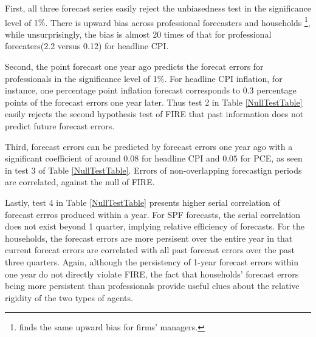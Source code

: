 \documentclass[]{article}
\begin{document}
First,  all three forecast series easily reject the unbiasedness test in the significance level of $1\%$. There is upward bias across professional forecasters and households \footnote{\citet{coibion2018firms} finds the same upward bias for firms' managers.}, while unsurprisingly, the bias is almost 20 times of that for professional forecaters(2.2 versus 0.12) for headline CPI. 

Second, the point forecast one year ago predicts the forecat errors for professionals in the significance level of 1\%. For headline CPI inflation, for instance, one percentage point inflation forecast corresponds to 0.3 percentage points of the forecast errors one year later. Thus test 2 in Table \ref{NullTestTable} easily rejects the second hypothesis test of FIRE that past information does not predict future forecast errors. 

Third, forecast errors can be predicted by forecast errors one year ago with a significant coefficient of around $0.08$ for headline CPI and $0.05$ for PCE, as seen in test 3 of Table \ref{NullTestTable}. Errors of non-overlapping forecastign periods are correlated, against the null of FIRE. 

Lastly, test 4 in Table \ref{NullTestTable} presents higher serial correlation of forecast errros produced within a year. For SPF forecasts, the serial correlation does not exist beyond 1 quarter, implying relative efficiency of forecasts. For the households, the forecast errors are more persisent over the entire year in that current forecat errors are correlated with all past forecast errors over the past three quarters.  Again, although the persistency of 1-year forecast errors within one year do not directly violate FIRE, the fact that households' forecast errors being more persistent than professionals provide useful clues about the relative rigidity of the two types of agents. 
\end{document}
